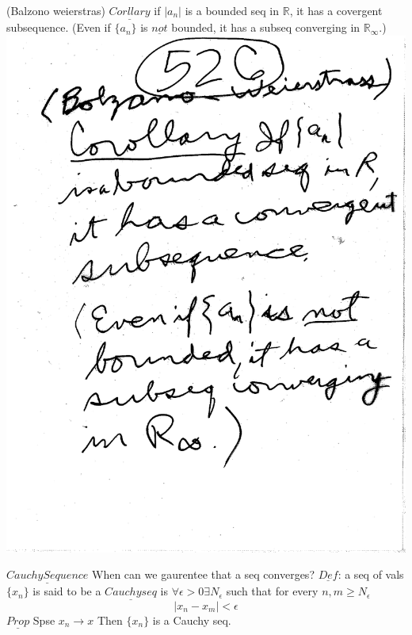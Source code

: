 \documentclass[10pt,a4paper]{article}
\begin{document}
{{\newpage 
(Balzono weierstras) $\underline{Corllary}$ if $|a_n|$ is a bounded seq in $\mathbb{R}$, it has a covergent subsequence. (Even if $\{ a_n \}$ is $\underline{not}$ bounded, it has a subseq converging in $\mathbb{R}_\infty$.)
\includegraphics[scale=.5]{Pages/LC_9}

\newpage
$\underline{Cauchy Sequence}$ When can we gaurentee that a seq converges? $\underline{Def}$: a seq of vals $\{ x_n \}$ is said to be a $\underline{Cauchy seq}$ is $\forall \epsilon > 0 \exists N_\epsilon$ such that for every $n,m \geq N_\epsilon$ $$|x_n - x_m| < \epsilon$$ 
$\underline{Prop}$ Spse $x_n \rightarrow x$ Then $\{ x_n \}$ is a Cauchy seq.

}}
\end{document}
